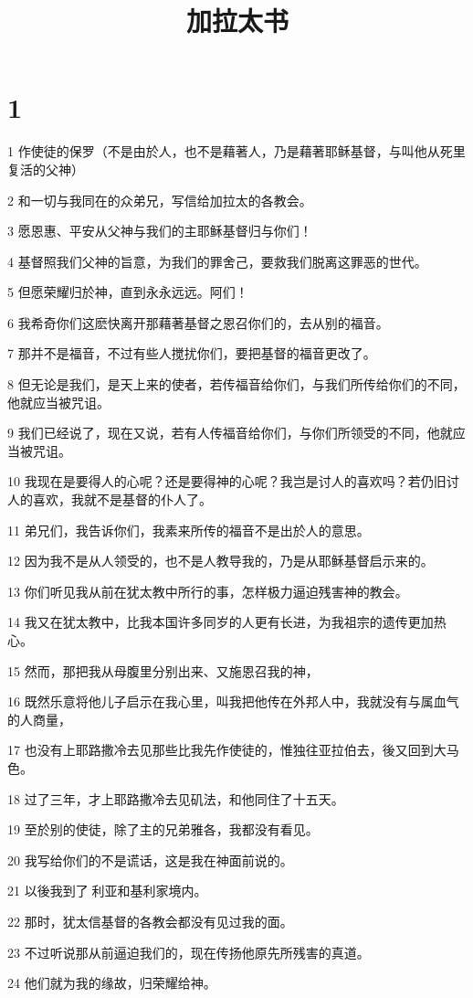 

\title{加拉太书}


\chapter{1}

\par 1 作使徒的保罗（不是由於人，也不是藉著人，乃是藉著耶稣基督，与叫他从死里复活的父神）
\par 2 和一切与我同在的众弟兄，写信给加拉太的各教会。
\par 3 愿恩惠、平安从父神与我们的主耶稣基督归与你们！
\par 4 基督照我们父神的旨意，为我们的罪舍己，要救我们脱离这罪恶的世代。
\par 5 但愿荣耀归於神，直到永永远远。阿们！
\par 6 我希奇你们这麽快离开那藉著基督之恩召你们的，去从别的福音。
\par 7 那并不是福音，不过有些人搅扰你们，要把基督的福音更改了。
\par 8 但无论是我们，是天上来的使者，若传福音给你们，与我们所传给你们的不同，他就应当被咒诅。
\par 9 我们已经说了，现在又说，若有人传福音给你们，与你们所领受的不同，他就应当被咒诅。
\par 10 我现在是要得人的心呢？还是要得神的心呢？我岂是讨人的喜欢吗？若仍旧讨人的喜欢，我就不是基督的仆人了。
\par 11 弟兄们，我告诉你们，我素来所传的福音不是出於人的意思。
\par 12 因为我不是从人领受的，也不是人教导我的，乃是从耶稣基督启示来的。
\par 13 你们听见我从前在犹太教中所行的事，怎样极力逼迫残害神的教会。
\par 14 我又在犹太教中，比我本国许多同岁的人更有长进，为我祖宗的遗传更加热心。
\par 15 然而，那把我从母腹里分别出来、又施恩召我的神，
\par 16 既然乐意将他儿子启示在我心里，叫我把他传在外邦人中，我就没有与属血气的人商量，
\par 17 也没有上耶路撒冷去见那些比我先作使徒的，惟独往亚拉伯去，後又回到大马色。
\par 18 过了三年，才上耶路撒冷去见矶法，和他同住了十五天。
\par 19 至於别的使徒，除了主的兄弟雅各，我都没有看见。
\par 20 我写给你们的不是谎话，这是我在神面前说的。
\par 21 以後我到了利亚和基利家境内。
\par 22 那时，犹太信基督的各教会都没有见过我的面。
\par 23 不过听说那从前逼迫我们的，现在传扬他原先所残害的真道。
\par 24 他们就为我的缘故，归荣耀给神。

